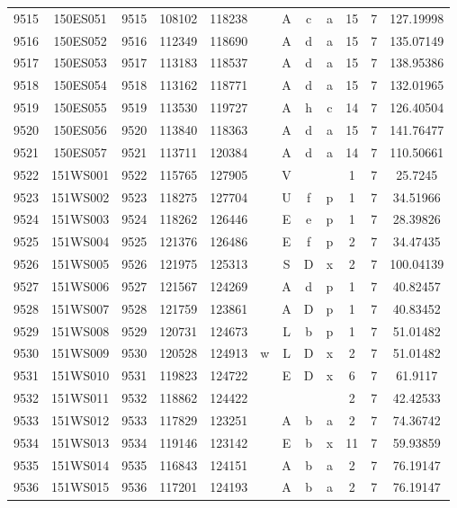 \begin{tabular}{|*{12}{c|}}
9515 & 150ES051 & 9515 & 108102 & 118238 &  & A & c & a & 15 & 7 & 127.19998 \\ 
9516 & 150ES052 & 9516 & 112349 & 118690 &  & A & d & a & 15 & 7 & 135.07149 \\ 
9517 & 150ES053 & 9517 & 113183 & 118537 &  & A & d & a & 15 & 7 & 138.95386 \\ 
9518 & 150ES054 & 9518 & 113162 & 118771 &  & A & d & a & 15 & 7 & 132.01965 \\ 
9519 & 150ES055 & 9519 & 113530 & 119727 &  & A & h & c & 14 & 7 & 126.40504 \\ 
9520 & 150ES056 & 9520 & 113840 & 118363 &  & A & d & a & 15 & 7 & 141.76477 \\ 
9521 & 150ES057 & 9521 & 113711 & 120384 &  & A & d & a & 14 & 7 & 110.50661 \\ 
9522 & 151WS001 & 9522 & 115765 & 127905 &  & V &  &  & 1 & 7 & 25.7245 \\ 
9523 & 151WS002 & 9523 & 118275 & 127704 &  & U & f & p & 1 & 7 & 34.51966 \\ 
9524 & 151WS003 & 9524 & 118262 & 126446 &  & E & e & p & 1 & 7 & 28.39826 \\ 
9525 & 151WS004 & 9525 & 121376 & 126486 &  & E & f & p & 2 & 7 & 34.47435 \\ 
9526 & 151WS005 & 9526 & 121975 & 125313 &  & S & D & x & 2 & 7 & 100.04139 \\ 
9527 & 151WS006 & 9527 & 121567 & 124269 &  & A & d & p & 1 & 7 & 40.82457 \\ 
9528 & 151WS007 & 9528 & 121759 & 123861 &  & A & D & p & 1 & 7 & 40.83452 \\ 
9529 & 151WS008 & 9529 & 120731 & 124673 &  & L & b & p & 1 & 7 & 51.01482 \\ 
9530 & 151WS009 & 9530 & 120528 & 124913 & w & L & D & x & 2 & 7 & 51.01482 \\ 
9531 & 151WS010 & 9531 & 119823 & 124722 &  & E & D & x & 6 & 7 & 61.9117 \\ 
9532 & 151WS011 & 9532 & 118862 & 124422 &  &  &  &  & 2 & 7 & 42.42533 \\ 
9533 & 151WS012 & 9533 & 117829 & 123251 &  & A & b & a & 2 & 7 & 74.36742 \\ 
9534 & 151WS013 & 9534 & 119146 & 123142 &  & E & b & x & 11 & 7 & 59.93859 \\ 
9535 & 151WS014 & 9535 & 116843 & 124151 &  & A & b & a & 2 & 7 & 76.19147 \\ 
9536 & 151WS015 & 9536 & 117201 & 124193 &  & A & b & a & 2 & 7 & 76.19147 \\ 

\end{tabular}
